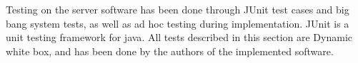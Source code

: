 Testing on the server software has been done through JUnit test cases and big bang system tests, as well as ad hoc testing during implementation.
JUnit is a unit testing framework for java\cite{JUnit}. All tests described in this section are Dynamic white box, and has been done by the authors of the implemented software.


